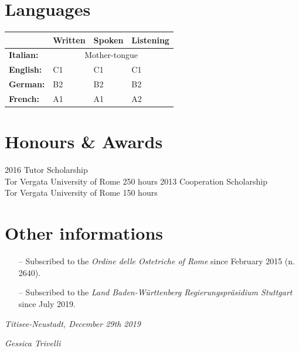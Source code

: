\documentclass[11pt]{friggeri-cv}
\begin{document}
\section{Languages}
\begin{table}[!h]
  \centering
  \renewcommand{\arraystretch}{1.45}
  \begin{tabular}{ p{3cm} p{3cm} p{3cm} p{3cm} }
    \hline
      & \textbf{Written}  
      & \textbf{Spoken} 
      & \textbf{Listening} \\ 
    \hline
    \textbf{Italian:}   
      & \multicolumn{3}{c}{Mother-tongue} \\
    \textbf{English:}
      & C1 
      & C1 
      & C1 \\ 
    \textbf{German:} 
      & B2 
      & B2 
      & B2 \\ 
    \textbf{French:} 
      & A1 
      & A1 
      & A2 \\
    \hline
  \end{tabular}
\end{table}

\section{Honours \& Awards}
\begin{entrylist}
  \entry
    {2016}
    {Tutor Scholarship}
    {\\Tor Vergata University of Rome}
    {250 hours}
  \entry
    {2013}
    {Cooperation Scholarship}
    {\\Tor Vergata University of Rome}
    {150 hours}
\end{entrylist}

\section{Other informations}
\begin{itemize}
  \item[--] Subscribed to the \textit{Ordine delle Ostetriche of Rome} since 
  February 2015 (n. 2640).
  \item[--] Subscribed to the \emph{Land Baden-W{\"u}rttenberg 
    Regierungspr{\"a}sidium Stuttgart} since July 2019.
\end{itemize}


\vspace{75pt}
\begin{flushleft}
  \large\emph{Titisee-Neustadt, December 29th 2019}
\end{flushleft}
\begin{flushright}
  \large\emph{Gessica Trivelli}
\end{flushright}
\end{document}
